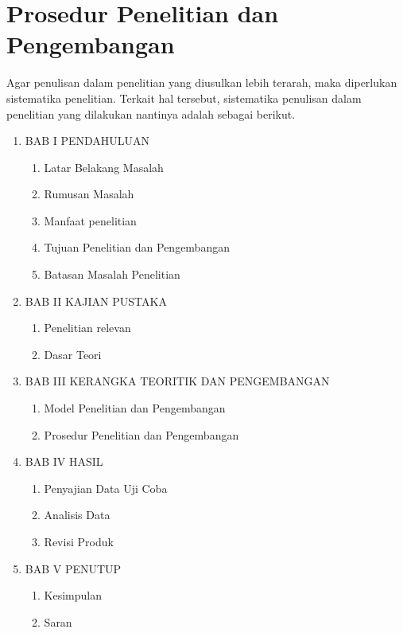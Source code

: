 \section{Prosedur Penelitian dan Pengembangan}

Agar penulisan dalam penelitian yang diusulkan lebih terarah,
maka diperlukan sistematika penelitian.
Terkait hal tersebut,
sistematika penulisan dalam penelitian yang dilakukan nantinya adalah sebagai berikut.

\begin{enumerate}[label=]

	\item BAB I PENDAHULUAN 
	\begin{enumerate}[label=\Alph*.]
		\item Latar Belakang Masalah
		\item Rumusan Masalah
		\item Manfaat penelitian
		\item Tujuan Penelitian dan Pengembangan
		\item Batasan Masalah Penelitian
	\end{enumerate}

	\item BAB II KAJIAN PUSTAKA 
	\begin{enumerate}[label=\Alph*.]
		\item Penelitian relevan
		\item Dasar Teori
	\end{enumerate}

	\item BAB III KERANGKA TEORITIK DAN PENGEMBANGAN 
	\begin{enumerate}[label=\Alph*.]
		\item Model Penelitian dan Pengembangan
		\item Prosedur Penelitian dan Pengembangan
	\end{enumerate}

	\item BAB IV HASIL 
	\begin{enumerate}[label=\Alph*.]
		\item Penyajian Data Uji Coba
		\item Analisis Data
		\item Revisi Produk
	\end{enumerate}

	\item BAB V PENUTUP 
	\begin{enumerate}[label=\Alph*.]
		\item Kesimpulan
		\item Saran
	\end{enumerate}

\end{enumerate}


